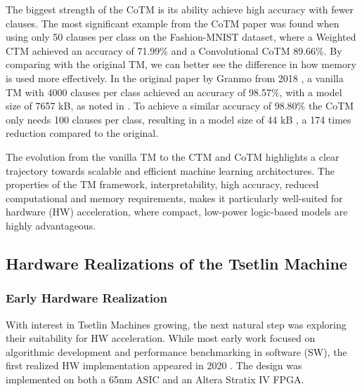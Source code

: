 The biggest strength of the CoTM is its ability achieve high accuracy with fewer clauses. The most significant example from the CoTM paper was found when using only 50 clauses per class on the Fashion-MNIST dataset, where a Weighted CTM achieved an accuracy of 71.99\% and a Convolutional CoTM 89.66\%. By comparing with the original TM, we can better see the difference in how memory is used more effectively. In the original paper by Granmo from 2018 \cite{GranmoOle-Christoffer2018TTM-}, a vanilla TM with 4000 clauses per class achieved an accuracy of 98.57\%, with a model size of 7657 kB, as noted in \cite{GranmoOle-Christoffer2019TCTM}. To achieve a similar accuracy of 98.80\% the CoTM only needs 100 clauses per class, resulting in a model size of 44 kB \cite{GlimsdalSondre2021CMTM}, a 174 times reduction compared to the original. 


The evolution from the vanilla TM to the CTM and CoTM highlights a clear trajectory towards scalable and efficient machine learning architectures. The properties of the TM framework, interpretability, high accuracy, reduced computational and memory requirements, makes it particularly well-suited for hardware (HW) acceleration, where compact, low-power logic-based models are highly advantageous.
\newpage
\subsection{Hardware Realizations of the Tsetlin Machine}

\subsubsection{Early Hardware Realization}

With interest in Tsetlin Machines growing, the next natural step was exploring their suitability for HW acceleration. While most early work focused on algorithmic development and performance benchmarking in software (SW), the first realized HW implementation appeared in 2020 \cite{WheeldonAdrian2020Labe}. The design was implemented on both a 65nm ASIC and an Altera Stratix IV FPGA. 

